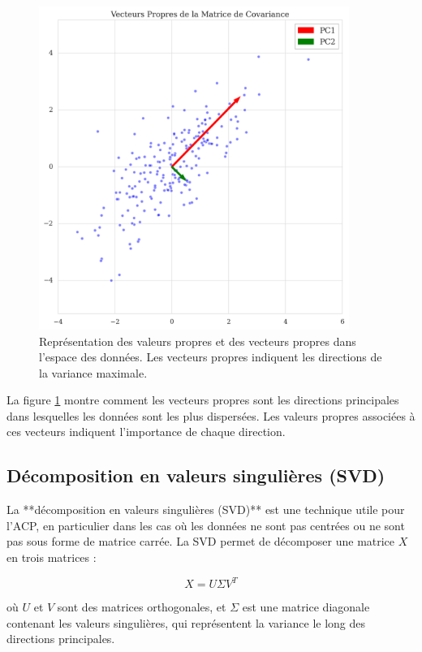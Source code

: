 \documentclass[a4paper,12pt]{report}
\begin{document}
\begin{figure}[H]
    \centering
    \includegraphics[width=0.9\textwidth]{eigenvec.png}
    \caption{Représentation des valeurs propres et des vecteurs propres dans l'espace des données. Les vecteurs propres indiquent les directions de la variance maximale.}
    \label{fig:valeurs_propres}
\end{figure}

La figure \ref{fig:valeurs_propres} montre comment les vecteurs propres sont les directions principales dans lesquelles les données sont les plus dispersées. Les valeurs propres associées à ces vecteurs indiquent l’importance de chaque direction.

\subsection{Décomposition en valeurs singulières (SVD)}

La **décomposition en valeurs singulières (SVD)** est une technique utile pour l'ACP, en particulier dans les cas où les données ne sont pas centrées ou ne sont pas sous forme de matrice carrée. La SVD permet de décomposer une matrice \( X \) en trois matrices :

\[
X = U \Sigma V^T
\]

où \( U \) et \( V \) sont des matrices orthogonales, et \( \Sigma \) est une matrice diagonale contenant les valeurs singulières, qui représentent la variance le long des directions principales.
\end{document}
